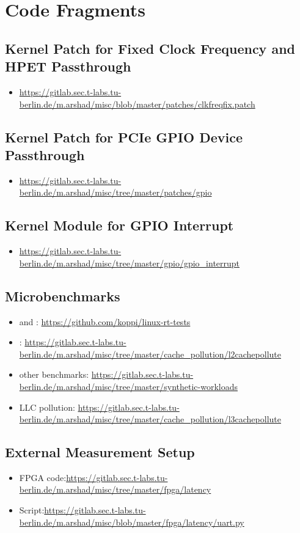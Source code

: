 \chapter{Code Fragments} \label{app:a}

\section{Kernel Patch for Fixed Clock Frequency and HPET Passthrough}
\begin{itemize}
	\item {\url{https://gitlab.sec.t-labs.tu-berlin.de/m.arshad/misc/blob/master/patches/clkfreqfix.patch}}
\end{itemize}	

\section{Kernel Patch for PCIe GPIO Device Passthrough}
\begin{itemize}
	\item {\url{https://gitlab.sec.t-labs.tu-berlin.de/m.arshad/misc/tree/master/patches/gpio}}
\end{itemize}	

\section{Kernel Module for GPIO Interrupt}
\begin{itemize}
	\item {\url{https://gitlab.sec.t-labs.tu-berlin.de/m.arshad/misc/tree/master/gpio/gpio_interrupt}}
\end{itemize}	

\section{Microbenchmarks}
\begin{itemize}	
	\item {\mthreadops{} and \mhackbench{}: \url{https://github.com/koppi/linux-rt-tests}}
	\item {\mcachepressure{}: \url{https://gitlab.sec.t-labs.tu-berlin.de/m.arshad/misc/tree/master/cache_pollution/l2cachepollute}}
	\item {other benchmarks: \url{https://gitlab.sec.t-labs.tu-berlin.de/m.arshad/misc/tree/master/synthetic-workloads}}
	\item {LLC pollution: \url{https://gitlab.sec.t-labs.tu-berlin.de/m.arshad/misc/tree/master/cache_pollution/l3cachepollute}}
\end{itemize}	


\section{External Measurement Setup}
\begin{itemize}
	\item{FPGA code:\url{https://gitlab.sec.t-labs.tu-berlin.de/m.arshad/misc/tree/master/fpga/latency}} 
	\item{Script:\url{https://gitlab.sec.t-labs.tu-berlin.de/m.arshad/misc/blob/master/fpga/latency/uart.py}} 
\end{itemize}	


